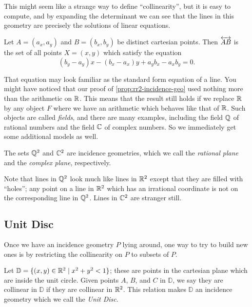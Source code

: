 This might seem like a strange way to define ``collinearity'', but it is easy to compute, and by expanding the determinant we can see that the lines in this geometry are precisely the solutions of linear equations.

\begin{cor}[Lines in \(\RR^2\)] \label{cor:cartesian-lines}
Let \(A = (a_x, a_y)\) and \(B = (b_x, b_y)\) be distinct cartesian points.
Then \(\overleftrightarrow{AB}\) is the set of all points \(X = (x,y)\) which satisfy the equation \[ (b_y-a_y)x - (b_x-a_x)y + a_yb_x - a_xb_y = 0. \]
\end{cor}

That equation may look familiar as the standard form equation of a line.
You might have noticed that our proof of \ref{prop:rr2-incidence-geo} used nothing more than the arithmetic on \(\mathbb{R}\).
This means that the result still holds if we replace \(\mathbb{R}\) by any object \(F\) where we have an arithmetic which behaves like that of \(\mathbb{R}\).
Such objects are called \emph{fields}, and there are many examples, including the field \(\mathbb{Q}\) of rational numbers and the field \(\mathbb{C}\) of complex numbers.
So we immediately get some additional models as well.

\begin{cor}
The sets \(\mathbb{Q}^2\) and \(\mathbb{C}^2\) are incidence geometries, which we call the \emph{rational plane} and the \emph{complex plane}, respectively.
\end{cor}

Note that lines in \(\mathbb{Q}^2\) look much like lines in \(\RR^2\) except that they are filled with ``holes''; any point on a line in \(\RR^2\) which has an irrational coordinate is not on the corresponding line in \(\mathbb{Q}^2\).
Lines in \(\mathbb{C}^2\) are stranger still.



\subsection{Unit Disc}

Once we have an incidence geometry \(P\) lying around, one way to try to build new ones is by restricting the collinearity on \(P\) to subsets of \(P\).

\begin{prop}
Let \(\mathbb{D} = \{ (x,y) \in \mathbb{R}^2 \mid x^2 + y^2 < 1 \}\); these are points in the cartesian plane which are inside the unit circle.
Given points \(A\), \(B\), and \(C\) in \(\mathbb{D}\), we say they are collinear in \(\mathbb{D}\) if they are collinear in \(\RR^2\).
This relation makes \(\mathbb{D}\) an incidence geometry which we call the \emph{Unit Disc}.
\end{prop}

